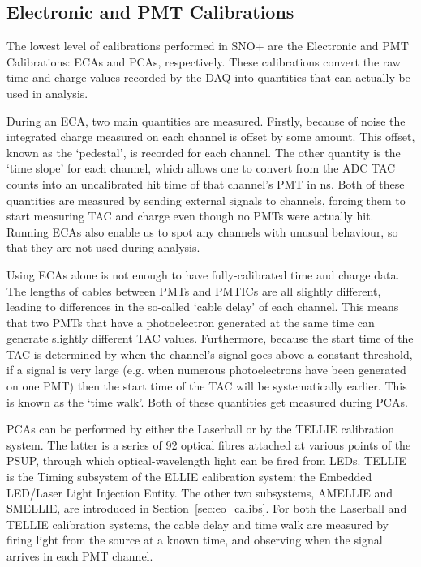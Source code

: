 \subsection{Electronic and PMT Calibrations}
The lowest level of calibrations performed in SNO+ are the Electronic and PMT Calibrations: ECAs and PCAs, respectively. These calibrations convert the raw time and charge values recorded by the DAQ into quantities that can actually be used in analysis.

During an ECA, two main quantities are measured. Firstly, because of noise the integrated charge measured on each channel is offset by some amount. This offset, known as the `pedestal', is recorded for each channel. The other quantity is the `time slope' for each channel, which allows one to convert from the ADC TAC counts into an uncalibrated hit time of that channel's PMT in \si{\ns}. Both of these quantities are measured by sending external signals to channels, forcing them to start measuring TAC and charge even though no PMTs were actually hit. Running ECAs also enable us to spot any channels with unusual behaviour, so that they are not used during analysis.

Using ECAs alone is not enough to have fully-calibrated time and charge data. The lengths of cables between PMTs and PMTICs are all slightly different, leading to differences in the so-called `cable delay' of each channel. This means that two PMTs that have a photoelectron generated at the same time can generate slightly different TAC values. Furthermore, because the start time of the TAC is determined by when the channel's signal goes above a constant threshold, if a signal is very large (e.g. when numerous photoelectrons have been generated on one PMT) then the start time of the TAC will be systematically earlier. This is known as the `time walk'. Both of these quantities get measured during PCAs.

PCAs can be performed by either the Laserball or by the TELLIE calibration system. The latter is a series of 92 optical fibres attached at various points of the PSUP, through which optical-wavelength light can be fired from LEDs. TELLIE is the Timing subsystem of the ELLIE calibration system: the Embedded LED/Laser Light Injection Entity. The other two subsystems, AMELLIE and SMELLIE, are introduced in Section~\ref{sec:eo_calibs}. For both the Laserball and TELLIE calibration systems, the cable delay and time walk are measured by firing light from the source at a known time, and observing when the signal arrives in each PMT channel.

